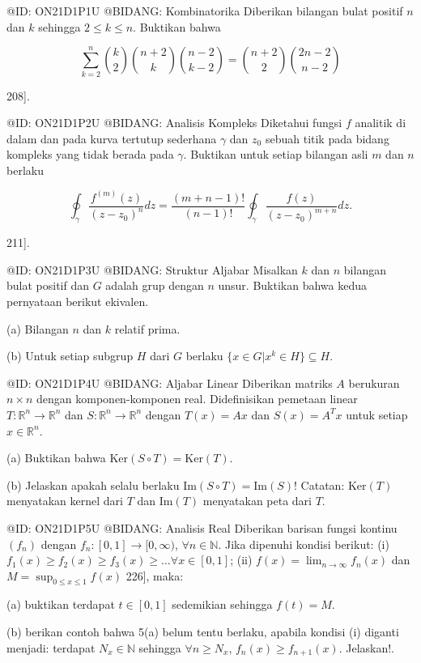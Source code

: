 @ID: ON21D1P1U
@BIDANG: Kombinatorika
Diberikan bilangan bulat positif $n$ dan $k$ sehingga $2\le k\le n$. Buktikan bahwa

$$
\sum_{k=2}^{n}\binom{k}{2}\binom{n+2}{k}\binom{n-2}{k-2}=\binom{n+2}{2}\binom{2n-2}{n-2}
$$

 208].

@ID: ON21D1P2U
@BIDANG: Analisis Kompleks
Diketahui fungsi $f$ analitik di dalam dan pada kurva tertutup sederhana $\gamma$ dan $z_{0}$ sebuah titik pada bidang kompleks yang tidak berada pada $\gamma$. Buktikan untuk setiap bilangan asli $m$ dan $n$ berlaku

$$
\oint_{\gamma}\frac{f^{(m)}(z)}{(z-z_{0})^{n}}dz=\frac{(m+n-1)!}{(n-1)!}\oint_{\gamma}\frac{f(z)}{(z-z_{0})^{m+n}}dz.
$$

 211].

@ID: ON21D1P3U
@BIDANG: Struktur Aljabar
Misalkan $k$ dan $n$ bilangan bulat positif dan $G$ adalah grup dengan $n$ unsur. Buktikan bahwa kedua pernyataan berikut ekivalen.

(a) Bilangan $n$ dan $k$ relatif prima.

(b) Untuk setiap subgrup $H$ dari $G$ berlaku $\{x\in G|x^{k}\in H\}\subseteq H$.

@ID: ON21D1P4U
@BIDANG: Aljabar Linear
Diberikan matriks $A$ berukuran $n\times n$ dengan komponen-komponen real. Didefinisikan pemetaan linear $T:\mathbb{R}^{n}\rightarrow\mathbb{R}^{n}$ dan $S:\mathbb{R}^{n}\rightarrow\mathbb{R}^{n}$ dengan $T(x)=Ax$ dan $S(x)=A^{T}x$ untuk setiap $x\in\mathbb{R}^{n}$.

(a) Buktikan bahwa $\text{Ker}(S\circ T)=\text{Ker}(T)$.

(b) Jelaskan apakah selalu berlaku $\text{Im}(S\circ T)=\text{Im}(S)$! 
Catatan: $\text{Ker}(T)$ menyatakan kernel dari $T$ dan $\text{Im}(T)$ menyatakan peta dari $T$.

@ID: ON21D1P5U
@BIDANG: Analisis Real
Diberikan barisan fungsi kontinu $(f_{n})$ dengan $f_{n}:[0,1]\rightarrow[0,\infty)$, $\forall n\in\mathbb{N}$. Jika dipenuhi kondisi berikut:
(i) $f_{1}(x)\ge f_{2}(x)\ge f_{3}(x)\ge\dots\forall x\in[0,1]$;
(ii) $f(x)=\lim_{n\rightarrow\infty}f_{n}(x)$ dan $M=\sup_{0\le x\le1}f(x)$ 226],
maka:

(a) buktikan terdapat $t\in[0,1]$ sedemikian sehingga $f(t)=M$.

(b) berikan contoh bahwa 5(a) belum tentu berlaku, apabila kondisi (i) diganti menjadi: terdapat $N_{x}\in\mathbb{N}$ sehingga $\forall n\ge N_{x}$, $f_{n}(x)\ge f_{n+1}(x)$. Jelaskan!.

